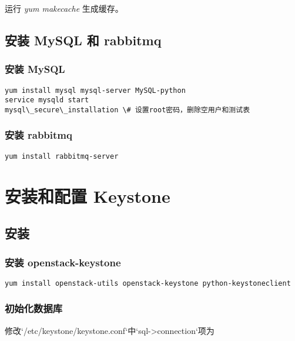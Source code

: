 \documentclass[letterpaper,10pt,english]{sphinxmanual}
\begin{document}
运行 \emph{yum makecache} 生成缓存。


\section{安装 MySQL 和 rabbitmq}
\label{prepare:mysql-rabbitmq}

\subsection{安装 MySQL}
\label{prepare:mysql}
\begin{Verbatim}[commandchars=\\\{\}]
yum install mysql mysql-server MySQL-python
service mysqld start
mysql\_secure\_installation \# 设置root密码，删除空用户和测试表
\end{Verbatim}


\subsection{安装 rabbitmq}
\label{prepare:rabbitmq}
\begin{Verbatim}[commandchars=\\\{\}]
yum install rabbitmq-server
\end{Verbatim}


\chapter{安装和配置 Keystone}
\label{keystone:keystone}\label{keystone::doc}

\section{安装}
\label{keystone:id1}

\subsection{安装 openstack-keystone}
\label{keystone:openstack-keystone}
\begin{Verbatim}[commandchars=\\\{\}]
yum install openstack-utils openstack-keystone python-keystoneclient
\end{Verbatim}


\subsection{初始化数据库}
\label{keystone:id2}
修改{}`/etc/keystone/keystone.conf{}`中{}`sql-\textgreater{}connection{}`项为
\end{document}
